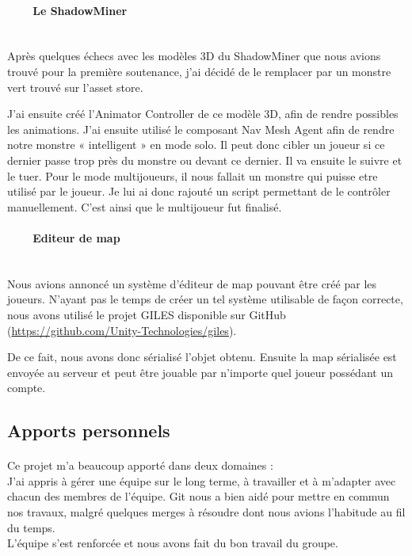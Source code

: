\documentclass[titlepage, 13px, a4paper]{report}
\begin{document}
\paragraph{~~~~Le ShadowMiner} \hspace{0pt} \\
Après quelques échecs avec les modèles 3D du ShadowMiner que nous avions trouvé pour la première soutenance, 
j’ai décidé de le remplacer par un monstre vert trouvé sur l’asset store.

J’ai ensuite créé l’Animator Controller de ce modèle 3D, afin de rendre possibles les animations.
J’ai ensuite utilisé le composant Nav Mesh Agent afin de rendre notre monstre « intelligent » en mode solo.
Il peut donc cibler un joueur si ce dernier passe trop près du monstre ou devant ce dernier. Il va ensuite le suivre et le tuer.
Pour le mode multijoueurs, il nous fallait un monstre qui puisse etre utilisé par le joueur.
Je lui ai donc rajouté un script permettant de le contrôler manuellement.
C’est ainsi que le multijoueur fut finalisé. \\


\paragraph{~~~~Editeur de map} \hspace{0pt} \\
Nous avions annoncé un système d’éditeur de map pouvant être créé par les joueurs.
N’ayant pas le temps de créer un tel système utilisable de façon correcte, nous avons utilisé le projet GILES 
disponible sur GitHub (\url{https://github.com/Unity-Technologies/giles}).

De ce fait, nous avons donc sérialisé l’objet obtenu. Ensuite la map sérialisée est envoyée au serveur et peut être 
jouable par n’importe quel joueur possédant un compte. \\


\subsection{Apports personnels}
\paragraph{} \hspace{0pt}
Ce projet m’a beaucoup apporté dans deux domaines : \\
J’ai appris à gérer une équipe sur le long terme, à travailler et à m'adapter avec chacun des membres de l'équipe. 
Git nous a bien aidé pour mettre en commun nos travaux, malgré quelques merges à résoudre dont 
nous avions l’habitude au fil du temps. \\
L’équipe s’est renforcée et nous avons fait du bon travail du groupe. \\ 
\end{document}
